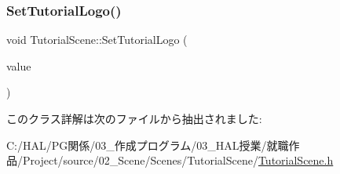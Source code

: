 \subsubsection{\texorpdfstring{Set\+Tutorial\+Logo()}{SetTutorialLogo()}}
{\footnotesize\ttfamily void Tutorial\+Scene\+::\+Set\+Tutorial\+Logo (\begin{DoxyParamCaption}\item[{\mbox{\hyperlink{class_tutorial_logo}{Tutorial\+Logo}} $\ast$}]{value }\end{DoxyParamCaption})\hspace{0.3cm}{\ttfamily [inline]}}



このクラス詳解は次のファイルから抽出されました\+:\begin{DoxyCompactItemize}
\item 
C\+:/\+H\+A\+L/\+P\+G関係/03\+\_\+作成プログラム/03\+\_\+\+H\+A\+L授業/就職作品/\+Project/source/02\+\_\+\+Scene/\+Scenes/\+Tutorial\+Scene/\mbox{\hyperlink{_tutorial_scene_8h}{Tutorial\+Scene.\+h}}\end{DoxyCompactItemize}

